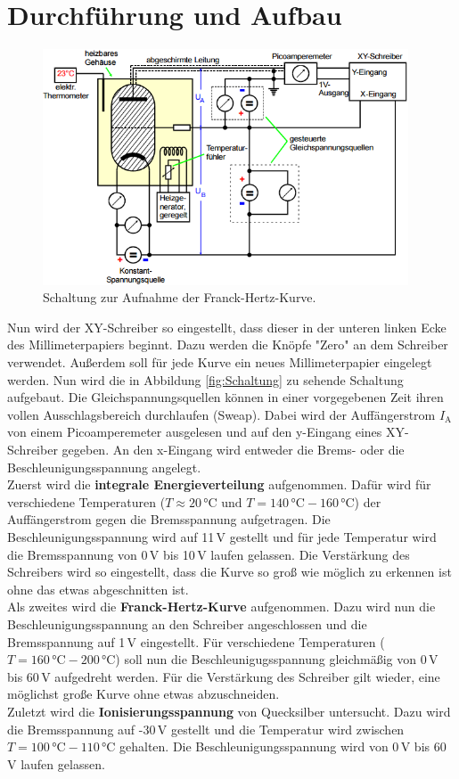 \section{Durchführung und Aufbau}
\label{sec:Durchführung}

\begin{figure}[H]
  \centering
  \includegraphics[height=7cm]{picture/Schaltung}
  \caption{Schaltung zur Aufnahme der Franck-Hertz-Kurve. \cite[10]{sample}}
  \label{fig:Schaltung}
\end{figure}

Nun wird der XY-Schreiber so eingestellt, dass dieser in der unteren linken Ecke des Millimeterpapiers beginnt. Dazu werden die Knöpfe "Zero" an dem Schreiber verwendet. Außerdem soll für jede Kurve ein neues Millimeterpapier eingelegt werden. Nun wird die in Abbildung \eqref{fig:Schaltung} zu sehende Schaltung aufgebaut. Die Gleichspannungsquellen können in einer vorgegebenen Zeit ihren vollen Ausschlagsbereich durchlaufen (Sweap). Dabei wird der Auffängerstrom $I_\text{A}$ von einem Picoamperemeter ausgelesen und auf den y-Eingang eines XY-Schreiber gegeben. An den x-Eingang wird entweder die Brems- oder die Beschleunigungsspannung angelegt. \\
Zuerst wird die \textbf{integrale Energieverteilung} aufgenommen. Dafür wird für verschiedene Temperaturen ($T \approx 20\,\text{°C und } T = 140\,\text{°C} - 160\,\text{°C}$) der Auffängerstrom gegen die Bremsspannung aufgetragen. Die Beschleunigungsspannung wird auf 11\,V gestellt und für jede Temperatur wird die Bremsspannung von 0\,V bis 10\,V laufen gelassen. Die Verstärkung des Schreibers wird so eingestellt, dass die Kurve so groß wie möglich zu erkennen ist ohne das etwas abgeschnitten ist. \\
Als zweites wird die \textbf{Franck-Hertz-Kurve} aufgenommen. Dazu wird nun die Beschleunigungsspannung an den Schreiber angeschlossen und die Bremsspannung auf 1\,V eingestellt. Für verschiedene Temperaturen ($T = 160\,\text{°C} - 200\,\text{°C}$) soll nun die Beschleunigugsspannung gleichmäßig von 0\,V bis 60\,V aufgedreht werden. Für die Verstärkung des Schreiber gilt wieder, eine möglichst große Kurve ohne etwas abzuschneiden. \\
Zuletzt wird die \textbf{Ionisierungsspannung} von Quecksilber untersucht. Dazu wird die Bremsspannung auf -30\,V gestellt und die Temperatur wird zwischen $T = 100\,\text{°C} - 110\,\text{°C}$ gehalten. Die Beschleunigungsspannung wird von 0\,V bis 60\,V laufen gelassen.
